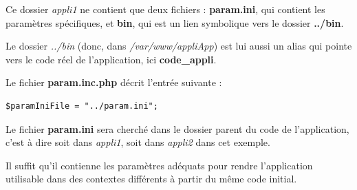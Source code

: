 Ce dossier \textit{appli1} ne contient que deux fichiers : \textbf{param.ini}, qui contient les paramètres spécifiques, et \textbf{bin}, qui est un lien symbolique vers le dossier \textbf{../bin}. 

Le dossier \textit{../bin} (donc, dans \textit{/var/www/appliApp}) est lui aussi un alias qui pointe vers le code réel de l'application, ici \textbf{code\_appli}.

Le fichier \textbf{param.inc.php} décrit l'entrée suivante :
\begin{lstlisting}
$paramIniFile = "../param.ini";
\end{lstlisting}

Le fichier \textbf{param.ini} sera cherché dans le dossier parent du code de l'application, c'est à dire soit dans \textit{appli1}, soit dans \textit{appli2} dans cet exemple.

Il suffit qu'il contienne les paramètres adéquats pour rendre l'application utilisable dans des contextes différents à partir du même code initial.